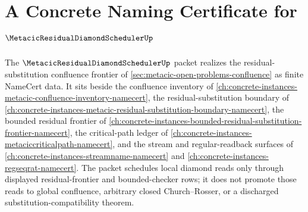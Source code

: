 \chapter{A Concrete Naming Certificate for $\MetacicResidualDiamondSchedulerUp$}
\label{ch:concrete-instances-metacic-residual-diamond-scheduler-namecert}

The $\MetacicResidualDiamondSchedulerUp$ packet realizes the residual-substitution confluence frontier of \autoref{sec:metacic-open-problems-confluence} as finite NameCert data. It sits beside the confluence inventory of \autoref{ch:concrete-instances-metacic-confluence-inventory-namecert}, the residual-substitution boundary of \autoref{ch:concrete-instances-metacic-residual-substitution-boundary-namecert}, the bounded residual frontier of \autoref{ch:concrete-instances-bounded-residual-substitution-frontier-namecert}, the critical-path ledger of \autoref{ch:concrete-instances-metaciccriticalpath-namecert}, and the stream and regular-readback surfaces of \autoref{ch:concrete-instances-streamname-namecert} and \autoref{ch:concrete-instances-regseqrat-namecert}. The packet schedules local diamond reads only through displayed residual-frontier and bounded-checker rows; it does not promote those reads to global confluence, arbitrary closed Church--Rosser, or a discharged substitution-compatibility theorem.

